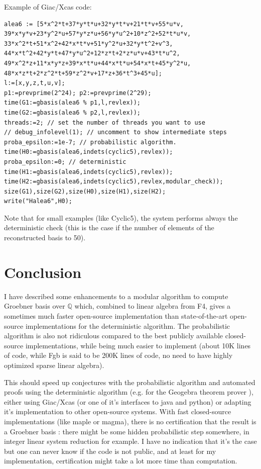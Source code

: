 \documentclass[a4paper,11pt]{book}
\begin{document}
\begin{giacjshere}
Example of Giac/Xcas code:
\begin{verbatim}
alea6 := [5*x^2*t+37*y*t*u+32*y*t*v+21*t*v+55*u*v,
39*x*y*v+23*y^2*u+57*y*z*u+56*y*u^2+10*z^2+52*t*u*v,
33*x^2*t+51*x^2+42*x*t*v+51*y^2*u+32*y*t^2+v^3,
44*x*t^2+42*y*t+47*y*u^2+12*z*t+2*z*u*v+43*t*u^2,
49*x^2*z+11*x*y*z+39*x*t*u+44*x*t*u+54*x*t+45*y^2*u,
48*x*z*t+2*z^2*t+59*z^2*v+17*z+36*t^3+45*u];
l:=[x,y,z,t,u,v];
p1:=prevprime(2^24); p2:=prevprime(2^29);
time(G1:=gbasis(alea6 % p1,l,revlex));
time(G2:=gbasis(alea6 % p2,l,revlex));
threads:=2; // set the number of threads you want to use
// debug_infolevel(1); // uncomment to show intermediate steps
proba_epsilon:=1e-7; // probabilistic algorithm.
time(H0:=gbasis(alea6,indets(cyclic5),revlex));
proba_epsilon:=0; // deterministic
time(H1:=gbasis(alea6,indets(cyclic5),revlex));
time(H2:=gbasis(alea6,indets(cyclic5),revlex,modular_check));
size(G1),size(G2),size(H0),size(H1),size(H2);
write("Halea6",H0);
\end{verbatim}
Note that for small examples (like Cyclic5), the system performs always the deterministic
check (this is the case if the number of elements of the reconstructed basis
to 50).

\section{Conclusion}
I have described some enhancements to a modular algorithm
to compute Groebner basis over $\mathbb{Q}$ which, combined to 
linear algebra from F4, gives
a sometimes much faster open-source implementation 
than state-of-the-art open-source implementations 
for the deterministic algorithm. 
The probabilistic algorithm is also not ridiculous
compared to the best publicly available closed-source implementations,
while being much easier to implement
(about 10K lines of code, while Fgb is said to be 200K lines of code,
no need to have highly optimized sparse linear algebra).

This should speed up conjectures with the probabilistic algorithm
and automated proofs using the deterministic
algorithm (e.g. for the Geogebra theorem prover
\cite{botanaimplementing}), 
either using Giac/Xcas (or one of it's interfaces
to java and python) or adapting it's implementation
to other open-source systems.
With fast closed-source implementations (like maple or magma), 
there is no certification that the result is a Groebner basis :
there might be some hidden probabilistic
step somewhere, in integer linear system reduction for example. I have
no indication that it's the case but one can never know if the code is
not public, and at least for my implementation, certification
might take a lot more time than computation. 


\end{giacjshere}
\end{document}
